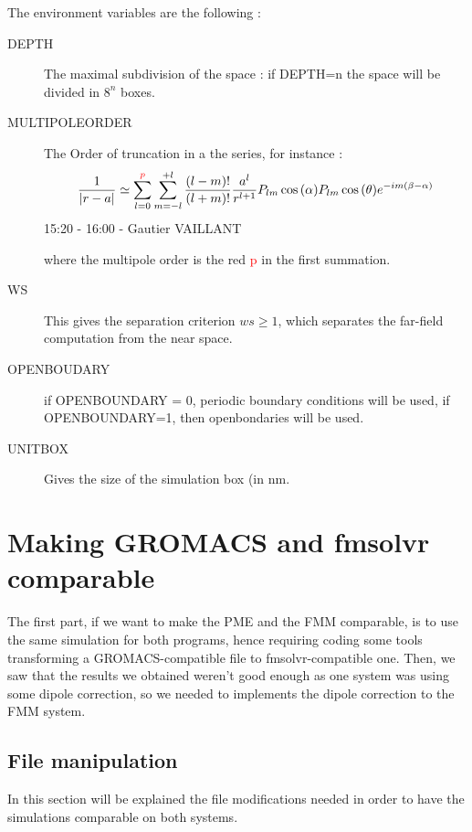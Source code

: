 \documentclass[11pt,twoside,a4paper]{report}
\begin{document}
The environment variables are the following :

\begin{description}
\item[DEPTH] The maximal subdivision of the space : if DEPTH=n the space will be divided in $8^{n}$ boxes.

\item[MULTIPOLEORDER] The Order of truncation in a the series, for instance :
\begin{equation*}
	\frac{1}{|r - a|} \simeq \sum\limits_{l=0}^{\textcolor{red}{p}} \sum\limits_{m = -l}^{+l} \frac{(l-m)!}{(l+m)!} \frac{a^l}{r^{l+1}} P_{lm}\cos{(\alpha)}P_{lm}\cos{(\theta)}e^{-im(\beta - \alpha)}
	\end{equation*}15:20 - 16:00 - Gautier VAILLANT
	
	where the multipole order is the red \textcolor{red}{p} in the first summation.
	
	
\item[WS] This gives the separation criterion $ws \geq 1$, which separates the far-field computation from the near space.

\item[OPENBOUDARY] if OPENBOUNDARY = 0, periodic boundary conditions will be used, if OPENBOUNDARY=1, then openbondaries will be used.

\item[UNITBOX] Gives the size of the simulation box (in nm.

\end{description}
 	
\section{Making GROMACS and fmsolvr comparable}	

The first part, if we want to make the PME and the FMM comparable, is to use the same simulation for both programs, hence requiring coding some tools transforming a GROMACS-compatible file to fmsolvr-compatible one. Then, we saw that the results we obtained weren't good enough as one system was using some dipole correction, so we needed to implements the dipole correction to the FMM system.

\subsection{File manipulation}

In this section will be explained the file modifications needed in order to have the simulations comparable on both systems.
\end{document}
